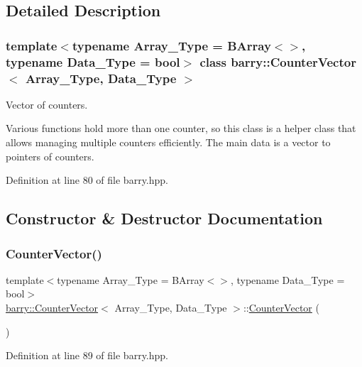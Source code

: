 \subsection{Detailed Description}
\subsubsection*{template$<$typename Array\+\_\+\+Type = B\+Array$<$$>$, typename Data\+\_\+\+Type = bool$>$\newline
class barry\+::\+Counter\+Vector$<$ Array\+\_\+\+Type, Data\+\_\+\+Type $>$}

Vector of counters. 

Various functions hold more than one counter, so this class is a helper class that allows managing multiple counters efficiently. The main data is a vector to pointers of counters. 

Definition at line 80 of file barry.\+hpp.



\subsection{Constructor \& Destructor Documentation}
\mbox{\label{classbarry_1_1_counter_vector_a620e7a96ebfd05fe71da6476f27c2850}} 
\subsubsection{\texorpdfstring{Counter\+Vector()}{CounterVector()}}
{\footnotesize\ttfamily template$<$typename Array\+\_\+\+Type = B\+Array$<$$>$, typename Data\+\_\+\+Type = bool$>$ \\
\hyperlink{classbarry_1_1_counter_vector}{barry\+::\+Counter\+Vector}$<$ Array\+\_\+\+Type, Data\+\_\+\+Type $>$\+::\hyperlink{classbarry_1_1_counter_vector}{Counter\+Vector} (\begin{DoxyParamCaption}{ }\end{DoxyParamCaption})\hspace{0.3cm}{\ttfamily [inline]}}



Definition at line 89 of file barry.\+hpp.

\mbox{\label{classbarry_1_1_counter_vector_a6a6cfc7b9a3ff220311d312786a8e3eb}} 
